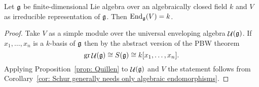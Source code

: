 \begin{corollary}
 Let $\mathfrak{g}$ be finite-dimensional Lie algebra over an algebraically closed field $k$ and $V$ as irreducible representation of $\mathfrak{g}$. Then $\operatorname{End}_{\mathfrak{g}}(V) = k$.
\end{corollary}
\begin{proof}
 Take $V$ as a simple module over the universal enveloping algebra $\mathop{\mathcal{U}}(\mathfrak{g})$. If $x_1, \dotsc, x_n$ is a $k$-basis of $\mathfrak{g}$ then by the abstract version of the PBW theorem
 \[
  \operatorname{gr} \mathop{\mathcal{U}}(\mathfrak{g}) \cong S(\mathfrak{g}) \cong k[x_1, \dotsc, x_n].
 \]
 Applying Proposition~\ref{prop: Quillen} to $\mathop{\mathcal{U}}(\mathfrak{g})$ and $V$ the statement follows from Corollary~\ref{cor: Schur generally needs only algebraic endomorphisms}.
\end{proof}

































